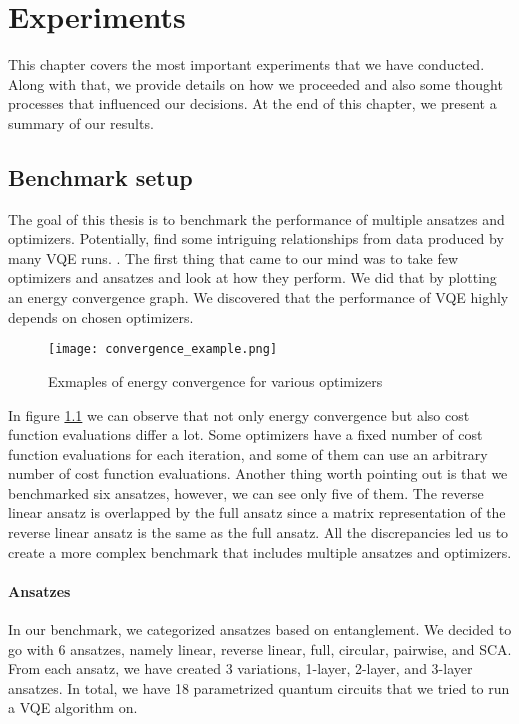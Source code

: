 \chapter{Experiments}\label{ch:experiments}
This chapter covers the most important experiments that we have conducted. Along with that, we provide details on how we proceeded and also some thought processes that influenced our decisions. At the end of this chapter, we present a summary of our results.

\section{Benchmark setup}
The goal of this thesis is to benchmark the performance of multiple ansatzes and optimizers. Potentially, find some intriguing relationships from data produced by many VQE runs. . The first thing that came to our mind was to take few optimizers and ansatzes and look at how they perform. We did that by plotting an energy convergence graph. We discovered that the performance of VQE highly depends on chosen optimizers. 

\begin{figure}
    \centering
    \texttt{[image: convergence\_example.png]}
    \caption{Exmaples of energy convergence for various optimizers}
    \label{fig:energy-convergence}
\end{figure}

In figure \ref{fig:energy-convergence} we can observe that not only energy convergence but also cost function evaluations differ a lot. Some optimizers have a fixed number of cost function evaluations for each iteration, and some of them can use an arbitrary number of cost function evaluations.  Another thing worth pointing out is that we benchmarked six ansatzes, however, we can see only five of them. The reverse linear ansatz is overlapped by the full ansatz since a matrix representation of the reverse linear ansatz is the same as the full ansatz. All the discrepancies led us to create a more complex benchmark that includes multiple ansatzes and optimizers.

\subsubsection{Ansatzes}
In our benchmark, we categorized ansatzes based on entanglement. We decided to go with 6 ansatzes, namely linear, reverse linear, full, circular, pairwise, and SCA. From each ansatz, we have created 3 variations, 1-layer, 2-layer, and 3-layer ansatzes. In total, we have 18 parametrized quantum circuits that we tried to run a VQE algorithm on.

